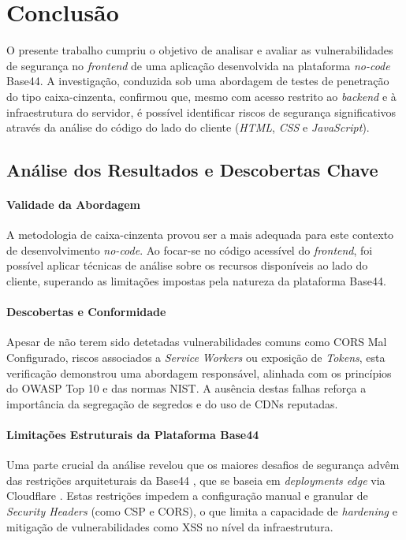\section{Conclusão}

O presente trabalho cumpriu o objetivo de analisar e avaliar as vulnerabilidades de segurança no \textit{frontend} de uma aplicação desenvolvida na plataforma \textit{no-code} Base44.
A investigação, conduzida sob uma abordagem de testes de penetração do tipo caixa-cinzenta, confirmou que, mesmo com acesso restrito ao \textit{backend} e à infraestrutura do servidor,
é possível identificar riscos de segurança significativos através da análise do código do lado do cliente (\textit{HTML}, \textit{CSS} e \textit{JavaScript}).

\subsection{Análise dos Resultados e Descobertas Chave}

\paragraph{Validade da Abordagem}
A metodologia de caixa-cinzenta provou ser a mais adequada para este contexto de desenvolvimento \textit{no-code}.
Ao focar-se no código acessível do \textit{frontend}, foi possível aplicar técnicas de análise sobre os recursos disponíveis ao lado do cliente,
superando as limitações impostas pela natureza da plataforma Base44.

\paragraph{Descobertas e Conformidade}
Apesar de não terem sido detetadas vulnerabilidades comuns como CORS Mal Configurado, riscos associados a \textit{Service Workers} ou exposição de \textit{Tokens},
esta verificação demonstrou uma abordagem responsável, alinhada com os princípios do OWASP Top 10 e das normas NIST.
A ausência destas falhas reforça a importância da segregação de segredos \cite{ref12} e do uso de CDNs reputadas.

\paragraph{Limitações Estruturais da Plataforma Base44}
Uma parte crucial da análise revelou que os maiores desafios de segurança advêm das restrições arquiteturais da Base44 \cite{ref16},
que se baseia em \textit{deployments edge} via Cloudflare \cite{ref17}.
Estas restrições impedem a configuração manual e granular de \textit{Security Headers} (como CSP e CORS),
o que limita a capacidade de \textit{hardening} e mitigação de vulnerabilidades como XSS no nível da infraestrutura.

